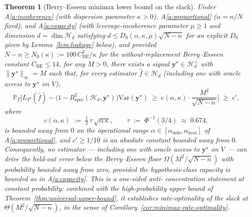 \documentclass[11pt,a4paper]{article}
\theoremstyle{plain}
\newtheorem{theorem}{Theorem}
\theoremstyle{definition}
\theoremstyle{remark}
\newcommand{\by}{\mathbf{y}}
\newcommand{\PR}{\mathbb{P}}
\newcommand{\Var}{\mathrm{Var}}
\newcommand{\Rspec}{R^2_{\mathrm{spec}}}
\newcommand{\Hcal}{\mathcal{H}}
\begin{document}
\begin{theorem}[Berry--Esseen minimax lower bound on the slack]
\label{thm:minimax-lower-bound}
Under A\ref{a:incoherence} (with dispersion parameter $\kappa > 0$),
A\ref{a:proportional} ($\alpha = n/N$ fixed), and
A\ref{a:capacity} (with leverage-incoherence parameter $\mu \ge 1$
and dimension $d = \dim \Hcal_d$ satisfying
$d \le D_0(\alpha, \kappa, \mu)\sqrt{N-n}$ for an explicit
$D_0$ given by Lemma~\ref{lem:leakage} below), and provided
$N - n \ge N_0(\kappa) := 100\, C_{\mathrm{BE}}^2/\kappa$ for the
without-replacement Berry--Esseen constant $C_{\mathrm{BE}} \le 14$,
for any $M > 0$, there exists a signal
$\by^\star \in \Hcal_d^\perp$ with $\|\by^\star\|_\infty = M$ such
that, for every estimator $\hat f \in \Hcal_d$ \emph{(including
one with oracle access to $\by^\star$ on $V$)},
\begin{equation}
    \PR_T\!\Big[
        L_{T^c}(\hat f) - \big(1 - \Rspec(\Hcal_d, \by^\star)\big)\Var(\by^\star)
        \;\geq\; c(\alpha, \kappa) \cdot \frac{M^2}{\sqrt{N - n}}
    \Big]
    \;\geq\; c',
    \label{eq:minimax-lower-bound}
\end{equation}
where
\[
    c(\alpha, \kappa) \;:=\; \tfrac{1}{2}\,\tau\,\sqrt{\alpha\,\kappa},
    \qquad
    \tau \;:=\; \Phi^{-1}(3/4) \;\approx\; 0.674,
\]
is bounded away from $0$ on the operational range
$\alpha \in [\alpha_{\min}, \alpha_{\max}]$ of A\ref{a:proportional},
and $c' \ge 1/10$ is an absolute constant bounded away from $0$.
Consequently, no estimator --- including one with oracle access to
$\by^\star$ on $V$ --- can drive the held-out error below the
Berry--Esseen floor $\Omega(M^2/\sqrt{N-n})$ \emph{with probability
bounded away from zero}, provided the hypothesis-class capacity is
bounded as in A\ref{a:capacity}.  This is a one-sided anti-%
concentration statement at constant probability: combined with the
high-probability upper bound of Theorem~\ref{thm:universal-upper-bound},
it establishes rate-optimality of the slack at $\Theta(M^2/\sqrt{N-n})$,
in the sense of Corollary~\ref{cor:minimax-rate-optimality}.
\end{theorem}
\end{document}
